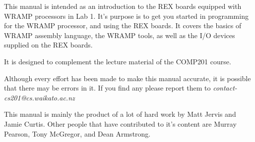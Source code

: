This manual is intended as an introduction to the REX boards equipped with WRAMP processors in Lab 1.
It's purpose is to get you started in programming for the WRAMP processor, and using the REX boards. It covers the basics of WRAMP assembly language, the WRAMP tools, as well as the I/O devices supplied on the REX boards.

It is designed to complement the lecture material of the COMP201 course.

Although every effort has been made to make this manual accurate, it is
possible that there may be errors in it.  If you find any please report
them to \emph{contact-cs201@cs.waikato.ac.nz}

This manual is mainly the product of a lot of hard work by Matt Jervis
and Jamie Curtis. Other people that have contributed to it's content
are Murray Pearson, Tony McGregor, and Dean Armstrong.
